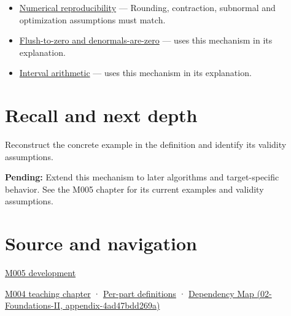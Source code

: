 \begin{itemize}
\item
  \hyperref[appendix-5f1a2c3f97ff]{Numerical reproducibility} --- Rounding, contraction, subnormal and optimization assumptions must match.
\item
  \hyperref[appendix-e979eb012782]{Flush-to-zero and denormals-are-zero} --- uses this mechanism in its explanation.
\item
  \hyperref[appendix-1823a14330cb]{Interval arithmetic} --- uses this mechanism in its explanation.
\end{itemize}

\section{Recall and next depth}\label{appendix-f11d1a521253-recall-and-next-depth}

Reconstruct the concrete example in the definition and identify its validity assumptions.

\textbf{Pending:} Extend this mechanism to later algorithms and target-specific behavior. See the M005 chapter for its current examples and validity assumptions.

\section{Source and navigation}\label{appendix-f11d1a521253-source-and-navigation}

\href{Continuous\%20Notes/Computing\%20Foundations\%20-\%20From\%20Bits\%20to\%20C++\%20and\%20Systems\%20APIs\#When\%20arithmetic\%20meets\%20uncertainty}{M005 development}

\href{Continuous\%20Notes/Computing\%20Foundations\%20-\%20From\%20Bits\%20to\%20C++\%20and\%20Systems\%20APIs\#A\%20stretching\%20ruler\%20for\%20real-valued\%20quantities}{M004 teaching chapter} · \hyperref[appendix-fd090d982a15-m004---parts-61-76]{Per-part definitions} · \href{../02-Foundations-II/main.pdf\#nameddest=appendix-4ad47bdd269a}{Dependency Map (02-Foundations-II, appendix-4ad47bdd269a)}
